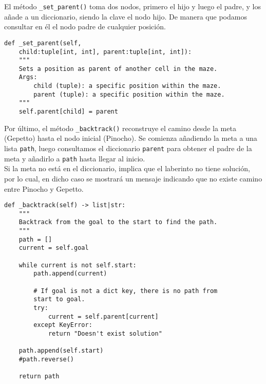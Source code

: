 El método \lstinline{_set_parent()} toma dos nodos, primero el hijo y luego el padre, y los añade a un diccionario, siendo la clave el nodo hijo. De manera que podamos consultar en él el nodo padre de cualquier posición.\\
\begin{lstlisting}
def _set_parent(self,
    child:tuple[int, int], parent:tuple[int, int]):
    """
    Sets a position as parent of another cell in the maze.
    Args:
        child (tuple): a specific position within the maze.
        parent (tuple): a specific position within the maze.
    """
    self.parent[child] = parent
\end{lstlisting}
\clearpage
Por último, el método \lstinline{_backtrack()} reconstruye el camino desde la meta (Gepetto) hasta el nodo inicial (Pinocho). Se comienza añadiendo la meta a una lista \lstinline{path}, luego consultamos el diccionario \lstinline{parent} para obtener el padre de la meta y añadirlo a \lstinline{path} hasta llegar al inicio.
\\\newline
Si la meta no está en el diccionario, implica que el laberinto no tiene solución, por lo cual, en dicho caso se mostrará un mensaje indicando que no existe camino entre Pinocho y Gepetto.\\
\begin{lstlisting}
def _backtrack(self) -> list|str:
    """
    Backtrack from the goal to the start to find the path.
    """
    path = []
    current = self.goal

    while current is not self.start:
        path.append(current)

        # If goal is not a dict key, there is no path from
        start to goal.
        try:
            current = self.parent[current]
        except KeyError:
            return "Doesn't exist solution"

    path.append(self.start)
    #path.reverse()

    return path
\end{lstlisting}
\clearpage
